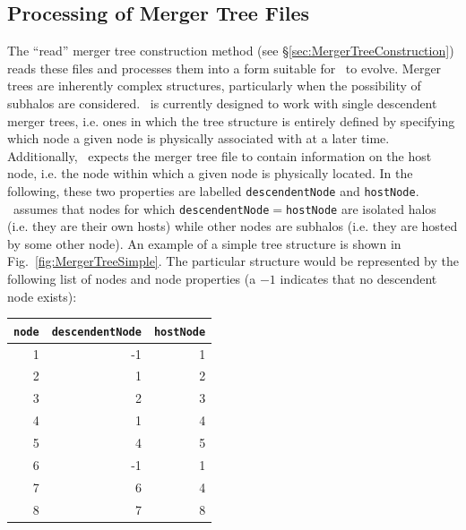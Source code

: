 \subsection{Processing of Merger Tree Files}\label{sec:MergerTreeFileProcessing}

The ``read'' merger tree construction method (see \S\ref{sec:MergerTreeConstruction}) reads these files and processes them into a form suitable for \glc\ to evolve. Merger trees are inherently complex structures, particularly when the possibility of subhalos are considered. \glc\ is currently designed to work with single descendent merger trees, i.e. ones in which the tree structure is entirely defined by specifying which \gls{node} a given \gls{node} is physically associated with at a later time. Additionally, \glc\ expects the merger tree file to contain information on the host \gls{node}, i.e. the node within which a given node is physically located. In the following, these two properties are labelled {\tt descendentNode} and {\tt hostNode}. \glc\ assumes that nodes for which {\tt descendentNode}$=${\tt hostNode} are isolated halos (i.e. they are their own hosts) while other nodes are subhalos (i.e. they are hosted by some other node). An example of a simple tree structure is shown in Fig.~\ref{fig:MergerTreeSimple}. The particular structure would be represented by the following list of nodes and node properties (a $-1$ indicates that no descendent node exists):
\begin{center}
\begin{tabular}{rrr}
\hline
{\tt node} & {\tt descendentNode} & {\tt hostNode} \\
\hline
1 & -1 & 1 \\
2 &  1 & 2 \\
3 &  2 & 3 \\
4 &  1 & 4 \\
5 &  4 & 5 \\
6 & -1 & 1 \\
7 &  6 & 4 \\
8 &  7 & 8 \\
\hline
\end{tabular}
\end{center}

